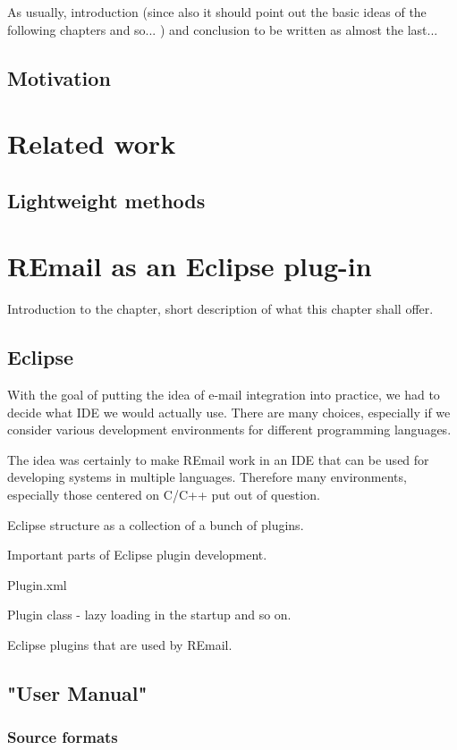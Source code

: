\documentclass[]{usiinfthesis}
\begin{document}
As usually, introduction (since also it should point out the basic ideas of the following chapters and so... ) and conclusion to be written as almost the last...

\section{Motivation}

\chapter{Related work}
\section{Lightweight methods}

\chapter{REmail as an Eclipse plug-in}
Introduction to the chapter, short description of what this chapter shall offer.
\section{Eclipse}
With the goal of putting the idea of e-mail integration into practice, we had to decide what IDE we would actually use. There are many choices, especially if we consider various development environments for different programming languages.

The idea was certainly to make REmail work in an IDE that can be used for developing systems in multiple languages. Therefore many environments, especially those centered on C/C++ put out of question. 

Eclipse structure as a collection of a bunch of plugins.

Important parts of Eclipse plugin development.

Plugin.xml

Plugin class - lazy loading in the startup and so on.

Eclipse plugins that are used by REmail.

\section{"User Manual"}

\subsection{Source formats}
\end{document}
